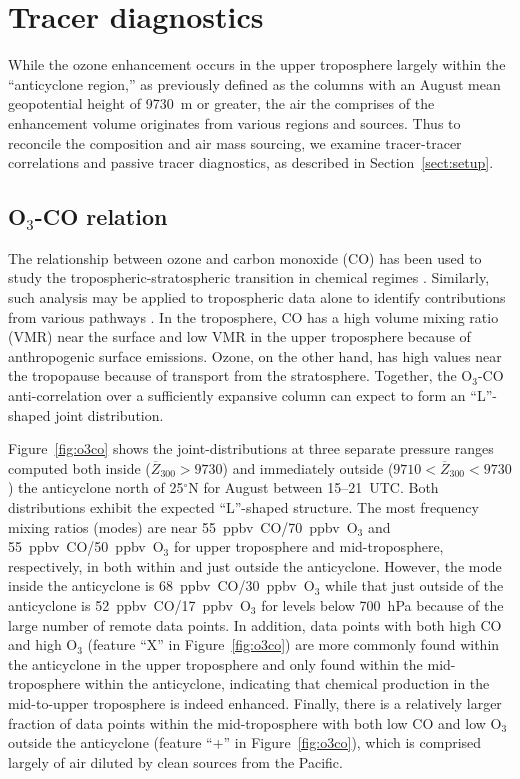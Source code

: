 \section{Tracer diagnostics}\label{sect:diag}

While the ozone enhancement occurs in the upper troposphere largely within the ``anticyclone
region,'' as previously defined as the columns with an August mean geopotential height of 9730~m
or greater, the air the comprises of the enhancement volume originates from various regions and
sources. Thus to reconcile the composition and air mass sourcing, we examine tracer-tracer
correlations and passive tracer diagnostics, as described in Section~\ref{sect:setup}.

\subsection{O$_3$-CO relation}\label{sect:diag/tracer}

The relationship between ozone and carbon monoxide ({CO}) has been
used to study the tropospheric-stratospheric transition in chemical regimes
\citep[e.g.][and references therein]{Pan:2007sw,Hegglin:2009fk}. Similarly,
such analysis may be applied to tropospheric data alone to identify contributions
from various pathways \citep[e.g.][]{Zhang:2006zr,Voulgarakis:2011fk,Cristofanelli:2013uq}.
In the troposphere, CO has a high volume mixing ratio (VMR) near the surface and low VMR in the upper
troposphere because of anthropogenic surface emissions. Ozone, on the other hand,
has high values near the tropopause because of transport from the stratosphere.
Together, the {O$_3$-CO} anti-correlation over a sufficiently expansive column
can expect to form an ``L''-shaped joint distribution.

Figure~\ref{fig:o3co} shows the joint-distributions at three separate pressure ranges
computed both inside ($\overline Z_{300}>9730$) and immediately
outside ($9710<\overline Z_{300}<9730$) the anticyclone north of 25$^\circ$N for
August between 15--21~UTC. Both distributions exhibit the expected ``L''-shaped
structure. The most frequency mixing ratios (modes) are near 55~ppbv~CO/70~ppbv~O$_3$ and 55~ppbv~CO/50~ppbv~O$_3$ for
upper troposphere and mid-troposphere, respectively, in both within and just outside the anticyclone.
However, the mode inside the anticyclone is 68~ppbv~CO/30~ppbv~O$_3$ while that
just outside of the anticyclone is 52~ppbv~CO/17~ppbv~O$_3$ for levels below 700~hPa
because of the large number of remote data points.
In addition, data points with both high CO and high O$_3$ (feature ``X'' in Figure~\ref{fig:o3co})
are more commonly found within the anticyclone in the upper troposphere and only
found within the mid-troposphere within the anticyclone, indicating that chemical
production in the mid-to-upper troposphere is indeed enhanced. Finally, there is
a relatively larger fraction of data points within the mid-troposphere with both low CO
and low O$_3$ outside the anticyclone (feature ``+'' in Figure~\ref{fig:o3co}), which
is comprised largely of air diluted by clean sources from the Pacific.

